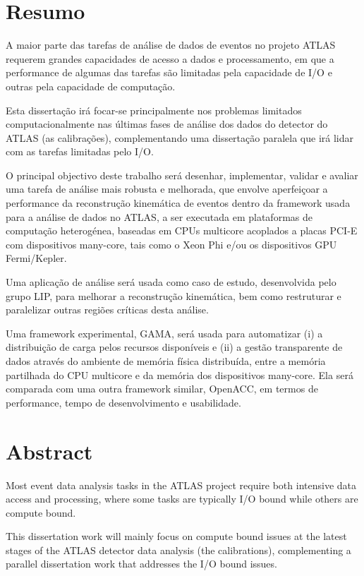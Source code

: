 
\chapter*{Resumo}

A maior parte das tarefas de análise de dados de eventos no projeto ATLAS requerem grandes capacidades de acesso a dados e processamento, em que a performance de algumas das tarefas são limitadas pela capacidade de I/O e outras pela capacidade de computação.

Esta dissertação irá focar-se principalmente nos problemas limitados computacionalmente nas últimas fases de análise dos dados do detector do ATLAS (as calibrações), complementando uma dissertação paralela que irá lidar com as tarefas limitadas pelo I/O.

O principal objectivo deste trabalho será desenhar, implementar, validar e avaliar uma tarefa de análise mais robusta e melhorada, que envolve aperfeiçoar a performance da reconstrução kinemática de eventos dentro da framework usada para a análise de dados no ATLAS, a ser executada em plataformas de computação heterogénea, baseadas em CPUs multicore acoplados a placas PCI-E com dispositivos many-core, tais como o \intel Xeon Phi e/ou os dispositivos GPU \nvidia Fermi/Kepler.

Uma aplicação de análise será usada como caso de estudo, desenvolvida pelo grupo LIP, para melhorar a reconstrução kinemática, bem como restruturar e paralelizar outras regiões críticas desta análise.

Uma framework experimental, GAMA, será usada para automatizar (i) a distribuição de carga pelos recursos disponíveis e (ii) a gestão transparente de dados através do ambiente de memória física distribuída, entre a memória partilhada do CPU multicore e da memória dos dispositivos many-core. Ela será comparada com uma outra framework similar, OpenACC, em termos de performance, tempo de desenvolvimento e usabilidade.

\newpage {}
\chapter*{Abstract}

Most event data analysis tasks in the ATLAS project require both intensive data access and processing, where some tasks are typically I/O bound while others are compute bound.

This dissertation work will mainly focus on compute bound issues at the latest stages of the ATLAS detector data analysis (the calibrations), complementing a parallel dissertation work that addresses the I/O bound issues.

